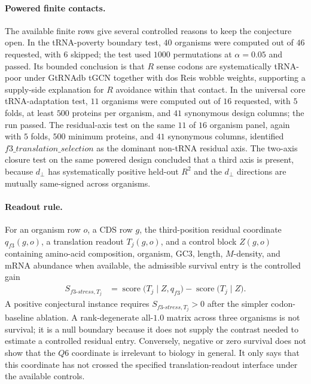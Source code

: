 \paragraph{Powered finite contacts.}
The available finite rows give several controlled reasons to keep the conjecture open.  In the tRNA-poverty boundary test, $40$ organisms were computed out of $46$ requested, with $6$ skipped; the test used $1000$ permutations at $\alpha=0.05$ and passed.  Its bounded conclusion is that $R$ sense codons are systematically tRNA-poor under GtRNAdb tGCN together with dos Reis wobble weights, supporting a supply-side explanation for $R$ avoidance within that contact.  In the universal core tRNA-adaptation test, $11$ organisms were computed out of $16$ requested, with $5$ folds, at least $500$ proteins per organism, and $41$ synonymous design columns; the run passed.  The residual-axis test on the same $11$ of $16$ organism panel, again with $5$ folds, $500$ minimum proteins, and $41$ synonymous columns, identified $f3\_translation\_selection$ as the dominant non-tRNA residual axis.  The two-axis closure test on the same powered design concluded that a third axis is present, because $d_{\perp}$ has systematically positive held-out $R^2$ and the $d_{\perp}$ directions are mutually same-signed across organisms.

\paragraph{Readout rule.}
For an organism row $o$, a CDS row $g$, the third-position residual coordinate $q_{f3}(g,o)$, a translation readout $T_j(g,o)$, and a control block $Z(g,o)$ containing amino-acid composition, organism, GC3, length, $M$-density, and mRNA abundance when available, the admissible survival entry is the controlled gain
$$
\begin{aligned}
S_{f3\text{-}stress,T_j}
  &= \operatorname{score}\bigl(T_j \mid Z,q_{f3}\bigr)
     - \operatorname{score}\bigl(T_j \mid Z\bigr).
\end{aligned}
$$
A positive conjectural instance requires $S_{f3\text{-}stress,T_j}>0$ after the simpler codon-baseline ablation.  A rank-degenerate all-$1.0$ matrix across three organisms is not survival; it is a null boundary because it does not supply the contrast needed to estimate a controlled residual entry.  Conversely, negative or zero survival does not show that the $Q6$ coordinate is irrelevant to biology in general.  It only says that this coordinate has not crossed the specified translation-readout interface under the available controls.

